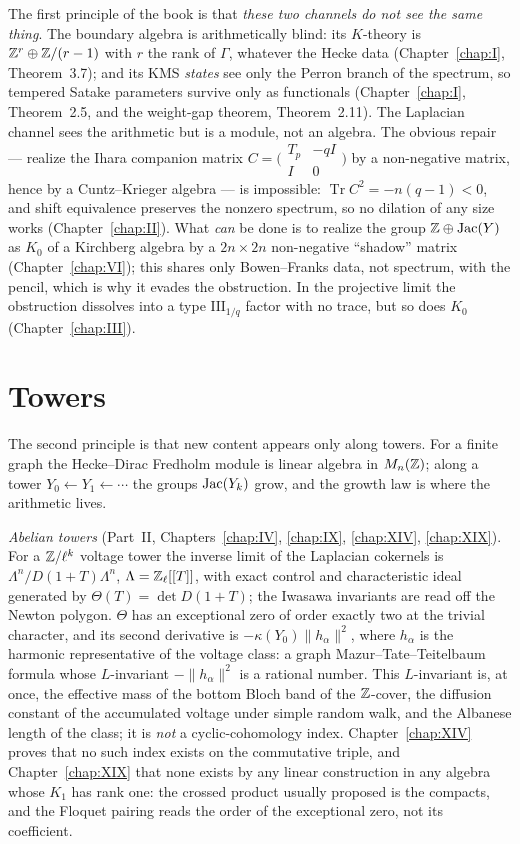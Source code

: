 The first principle of the book is that \emph{these two channels do not see the same
thing}. The boundary algebra is arithmetically blind: its $K$-theory is
$\mathbb{Z}^r\oplus\mathbb{Z}/(r-1)$ with $r$ the rank of $\Gamma$, whatever the Hecke data
(Chapter~\ref{chap:I}, Theorem~3.7); and its KMS \emph{states} see only the Perron
branch of the spectrum, so tempered Satake parameters survive only as functionals
(Chapter~\ref{chap:I}, Theorem~2.5, and the weight-gap theorem, Theorem~2.11). The
Laplacian channel sees the arithmetic but is a module, not an algebra. The obvious repair
--- realize the Ihara companion matrix
$C=\bigl(\begin{smallmatrix}T_p&-qI\\ I&0\end{smallmatrix}\bigr)$ by a non-negative
matrix, hence by a Cuntz--Krieger algebra --- is impossible:
$\operatorname{Tr}C^2=-n(q-1)<0$, and shift equivalence preserves the nonzero spectrum,
so no dilation of any size works (Chapter~\ref{chap:II}). What \emph{can} be done is
to realize the group $\mathbb{Z}\oplus\operatorname{Jac}(Y)$ as $K_0$ of a Kirchberg algebra by a
$2n\times2n$ non-negative ``shadow'' matrix (Chapter~\ref{chap:VI}); this shares only
Bowen--Franks data, not spectrum, with the pencil, which is why it evades the
obstruction. In the projective limit the obstruction dissolves into a type
$\mathrm{III}_{1/q}$ factor with no trace, but so does $K_0$ (Chapter~\ref{chap:III}).

\section{Towers}

The second principle is that new content appears only along towers. For a finite
graph the Hecke--Dirac Fredholm module is linear algebra in $M_n(\mathbb{Z})$; along a tower
$Y_0\leftarrow Y_1\leftarrow\cdots$ the groups $\operatorname{Jac}(Y_k)$ grow, and the growth law is
where the arithmetic lives.

\emph{Abelian towers} (Part~II, Chapters~\ref{chap:IV}, \ref{chap:IX}, \ref{chap:XIV},
\ref{chap:XIX}). For a $\mathbb{Z}/\ell^k$ voltage tower the inverse limit of the Laplacian
cokernels is $\Lambda^n/D(1+T)\Lambda^n$, $\Lambda=\mathbb{Z}_\ell[[T]]$, with exact control and
characteristic ideal generated by $\Theta(T)=\det D(1+T)$; the Iwasawa invariants are
read off the Newton polygon. $\Theta$ has an exceptional zero of order exactly two at
the trivial character, and its second derivative is $-\kappa(Y_0)\|h_\alpha\|^2$, where
$h_\alpha$ is the harmonic representative of the voltage class: a graph
Mazur--Tate--Teitelbaum formula whose $L$-invariant $-\|h_\alpha\|^2$ is a rational
number. This $L$-invariant is, at once, the effective mass of the bottom Bloch band of
the $\mathbb{Z}$-cover, the diffusion constant of the accumulated voltage under simple random
walk, and the Albanese length of the class; it is \emph{not} a cyclic-cohomology index.
Chapter~\ref{chap:XIV} proves that no such index exists on the commutative triple, and
Chapter~\ref{chap:XIX} that none exists by any linear construction in any algebra whose
$K_1$ has rank one: the crossed product usually proposed is the compacts, and the Floquet
pairing reads the order of the exceptional zero, not its coefficient.

